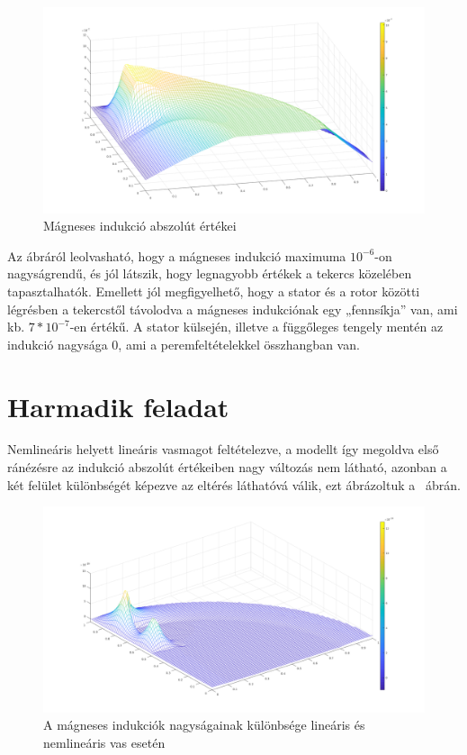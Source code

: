 \begin{figure}[!h]
	\centering
	\includegraphics[width=150mm, keepaspectratio]{figures/terek/normal_eloszlas}
	\caption{Mágneses indukció abszolút értékei}
	\label{fig:normaleloszlas}
\end{figure}


Az ábráról leolvasható, hogy a mágneses indukció maximuma  $ 10^{-6} $-on nagyságrendű, és jól látszik, hogy legnagyobb értékek a tekercs közelében tapasztalhatók. Emellett jól megfigyelhető, hogy a stator és a rotor közötti légrésben a tekercstől távolodva a mágneses indukciónak egy „fennsíkja” van, ami kb.  $ 7*10^{-7} $-en értékű. A stator külsején, illetve a függőleges tengely mentén az indukció nagysága 0, ami a peremfeltételekkel összhangban van.
\newpage
\section{Harmadik feladat}
Nemlineáris helyett lineáris vasmagot feltételezve, a modellt így megoldva első ránézésre az indukció abszolút értékeiben nagy változás nem látható, azonban a két felület különbségét képezve az eltérés láthatóvá válik, ezt ábrázoltuk a ~ábrán.

\begin{figure}[!h]
	\centering
	\includegraphics[width=150mm, keepaspectratio]{figures/terek/kulonbseg}
	\caption{A mágneses indukciók nagyságainak különbsége lineáris és nemlineáris vas esetén}
	\label{fig:kulonbseg}
\end{figure}

